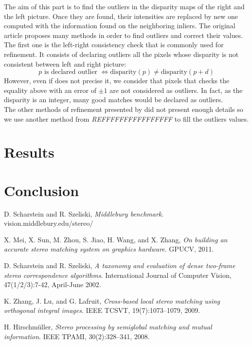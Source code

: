 \documentclass{article}
\begin{document}
The aim of this part is to find the outliers in the disparity maps of the right and the left picture. Once they are found, their intensities are replaced by new one computed with the information found on the neighboring inliers. The original article
\cite{adCensus} proposes many methods in order to find outliers and correct their values.\\
The first one is the left-right consistency check that is commonly used for refinement. It consists of declaring outliers all the pixels whose disparity is not consistent between left and right picture:
\[
	p \text{ is declared outlier } \Leftrightarrow \text{disparity}(p) \neq \text{disparity}(p+d)
\]
However, even if \cite{adCensus} does not precise it, we consider that pixels that checks the equality above with an error of $\pm 1$ are not considered as outliers. In fact, as the disparity is an integer, many good matches would be declared as outliers.\\
The other methods of refinement presented by \cite{adCensus} did not present enough details so we use another method from \textit{REFFFFFFFFFFFFFFFF} to fill the outliers values.

\newpage

\section{Results}

\newpage

\section{Conclusion}

\newpage

\begin{thebibliography}{9}
	D. Scharstein and R. Szeliski,
	\emph{ Middlebury benchmark}.
	vision.middlebury.edu/stereo/

	X. Mei, X. Sun, M. Zhou, S. Jiao, H. Wang, and X. Zhang,
	\emph{On building an accurate stereo matching system on graphics hardware}.
	GPUCV,
	2011.

	D. Scharstein and R. Szeliski,
   	\emph{ A taxonomy and evaluation of dense two-frame stereo correspondence algorithms}.
	International Journal of Computer Vision, 
	47(1/2/3):7-42, 
	April-June 2002.

	K. Zhang, J. Lu, and G. Lafruit,
	\emph{ Cross-based local stereo matching using orthogonal integral images}.
	IEEE TCSVT,
	19(7):1073–1079,
	2009.
	
	H. Hirschmüller,
	\emph{Stereo processing by semiglobal matching
and mutual information}.
	IEEE TPAMI,
	30(2):328–341,
	2008.

\end{thebibliography}
\end{document}
